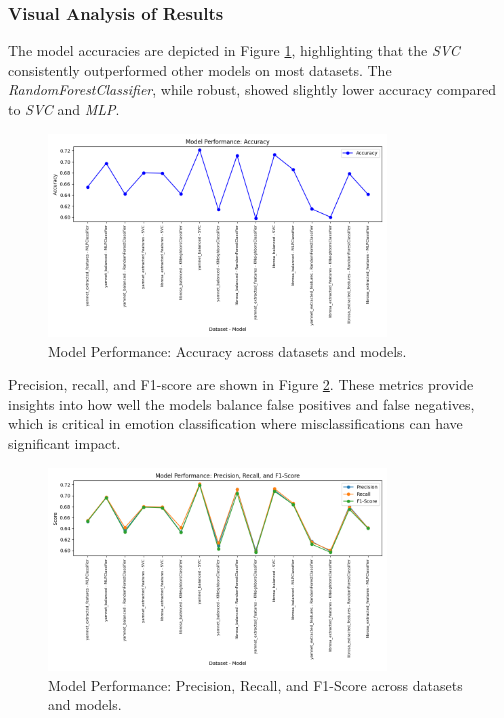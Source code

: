 \documentclass{article}
\begin{document}
\subsubsection*{Visual Analysis of Results}

The model accuracies are depicted in Figure \ref{fig:accuracy_plot}, highlighting that the \textit{SVC} 
consistently outperformed other models on most datasets. The \textit{RandomForestClassifier}, while robust, showed 
slightly lower accuracy compared to \textit{SVC} and \textit{MLP}. \text

\begin{figure}[!h]
    \centering
    \includegraphics[width=0.8\textwidth]{../assets/model_performance_accuracy.png}
    \caption{Model Performance: Accuracy across datasets and models.}
    \label{fig:accuracy_plot}
\end{figure}

Precision, recall, and F1-score are shown in Figure \ref{fig:other_metrics_plot}. These metrics provide insights into 
how well the models balance false positives and false negatives, which is critical in emotion classification where 
misclassifications can have significant impact.

\begin{figure}[!h]
    \centering
    \includegraphics[width=0.8\textwidth]{../assets/model_performance_other_metrics.png}
    \caption{Model Performance: Precision, Recall, and F1-Score across datasets and models.}
    \label{fig:other_metrics_plot}
\end{figure}
\end{document}
